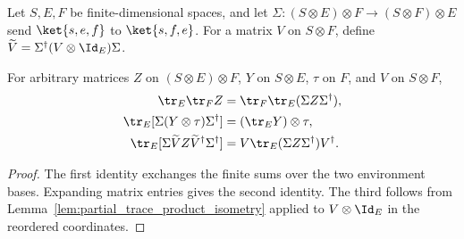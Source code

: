 \begin{definition}
    \label{def:fresh_environment_action}
    \leanok
    Let $S,E,F$ be finite-dimensional spaces, and let
    $\Sigma:(S\otimes E)\otimes F\to(S\otimes F)\otimes E$ send
    $\ket{s,e,f}$ to $\ket{s,f,e}$. For a matrix $V$ on $S\otimes F$,
    define $\widetilde V=\Sigma^\dagger(V\otimes\Id_E)\Sigma$.
\end{definition}

\begin{theorem}
    \label{thm:environment_trace_exchange}
    \leanok
    For arbitrary matrices $Z$ on $(S\otimes E)\otimes F$, $Y$ on
    $S\otimes E$, $\tau$ on $F$, and $V$ on $S\otimes F$,
    \begin{align}
        \tr_E\tr_F Z & =\tr_F\tr_E(\Sigma Z\Sigma^\dagger),
        \notag                                                   \\
        \tr_E[\Sigma(Y\otimes\tau)\Sigma^\dagger]
                     & =(\tr_EY)\otimes\tau,
        \notag                                                   \\
        \tr_E[\Sigma\widetilde VZ\widetilde V^\dagger\Sigma^\dagger]
                     & =V\tr_E(\Sigma Z\Sigma^\dagger)V^\dagger.
        \label{eq:representations_environment_exchange}
    \end{align}
\end{theorem}
\begin{proof}\leanok
    The first identity exchanges the finite sums over the two environment
    bases. Expanding matrix entries gives the second identity.
    The third follows from Lemma~\ref{lem:partial_trace_product_isometry}
    applied to $V\otimes\Id_E$ in the reordered coordinates.
\end{proof}

